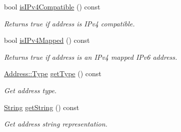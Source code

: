 \begin{DoxyCompactItemize}
bool \hyperlink{classlibrary_1_1io_1_1ip_1_1_address_a47df4ff73e75b42155cb59f327064c56}{is\+I\+Pv4\+Compatible} () const
\begin{DoxyCompactList}\small\item\em Returns true if address is I\+Pv4 compatible. \end{DoxyCompactList}\item 
bool \hyperlink{classlibrary_1_1io_1_1ip_1_1_address_ae995e64ad459196faf3b0b1e2379eb38}{is\+I\+Pv4\+Mapped} () const
\begin{DoxyCompactList}\small\item\em Returns true if address is an I\+Pv4 mapped I\+Pv6 address. \end{DoxyCompactList}\item 
\hyperlink{classlibrary_1_1io_1_1ip_1_1_address_a1a4f284eb6f5f52b67f2e34a93f225af}{Address\+::\+Type} \hyperlink{classlibrary_1_1io_1_1ip_1_1_address_abd4d3f82370ea5882822a85876f670d8}{get\+Type} () const
\begin{DoxyCompactList}\small\item\em Get address type. \end{DoxyCompactList}\item 
\hyperlink{namespacelibrary_1_1io_1_1ip_a2ac70ed8dfa9969304e09cead6a39459}{String} \hyperlink{classlibrary_1_1io_1_1ip_1_1_address_aaa3c07764609a34d9f80df26981cad45}{get\+String} () const
\begin{DoxyCompactList}\small\item\em Get address string representation. \end{DoxyCompactList}\end{DoxyCompactItemize}
